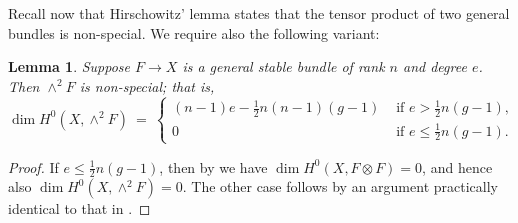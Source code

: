 \documentclass[10pt]{amsart}
\numberwithin{equation}{section}
\newcommand{\Kx}{K_X}
\newtheorem{lemma}[theorem]{{\textbf Lemma}}
\begin{document}
Recall now that Hirschowitz' lemma \cite[\S 4.6]{Hir} states that the tensor product of two general bundles is non-special. We require also the following variant:
\begin{lemma} \label{non-special}
Suppose $F \to X$ is a general stable bundle of rank $n$ and degree $e$. Then $\wedge^2 F$ is non-special; that is,
\[
\dim H^0(X, \wedge^2 F) \ = \ \begin{cases} (n-1)e - \frac{1}{2} n(n-1)(g-1) & \text{\ if \ } e > \frac{1}{2}n(g-1),\\  0  & \text{\ if \ } e \le \frac{1}{2}n(g-1).
\end{cases}
\]
\end{lemma}
\begin{proof}
If $e \le \frac{1}{2}n(g-1)$, then by \cite[Lemma A.1]{CH2} we have $\dim H^0 (X, F \otimes F) = 0$, and hence also $\dim H^0 (X, \wedge^2 F) = 0$. The other case follows by an argument practically identical to that in \cite[Corollary A.3]{CH2}.
\end{proof}
\end{document}
